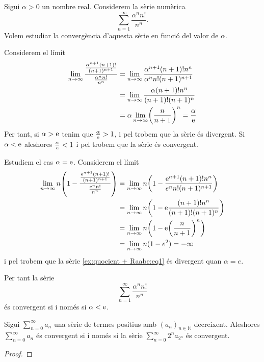 \documentclass[../Apunts.tex]{subfiles}
\begin{document}
	\begin{example}
		\label{ex:quocient + Raabe}
		Sigui \(\alpha>0\) un nombre real. Considerem la sèrie numèrica
		\begin{equation}
			\label{ex:quocient + Raabe:eq1}
			\sum_{n=1}^{\infty}\frac{\alpha^{n}n!}{n^{n}}.
		\end{equation}
		Volem estudiar la convergència d'aquesta sèrie en funció del valor de \(\alpha\).
		\begin{solution}
			Considerem el límit
			\begin{align*}
				\lim_{n\to\infty}\frac{\frac{\alpha^{n+1}(n+1)!}{(n+1)^{n+1}}}{\frac{\alpha^{n}n!}{n^{n}}}&=\lim_{n\to\infty}\frac{\alpha^{n+1}(n+1)!n^{n}}{\alpha^{n}n!(n+1)^{n+1}} \\
				&=\lim_{n\to\infty}\frac{\alpha(n+1)!n^{n}}{(n+1)!(n+1)^{n}} \\
				&=\alpha\lim_{n\to\infty}\left(\frac{n}{n+1}\right)^{n}=\frac{\alpha}{\e} %
			\end{align*}
			Per tant, si \(\alpha>\textrm{e}\) tenim que \(\frac{\alpha}{\textrm{e}}>1\), i pel  trobem que la sèrie és divergent. Si \(\alpha<\textrm{e}\) aleshores \(\frac{\alpha}{\textrm{e}}<1\) i pel  trobem que la sèrie és convergent.
			
			Estudiem el cas \(\alpha=\textrm{e}\). Considerem el límit
			\begin{align*}
				\lim_{n\to\infty}n\left(1-\frac{\frac{\e^{n+1}(n+1)!}{(n+1)^{n+1}}}{\frac{\e^{n}n!}{n^{n}}}\right)&=\lim_{n\to\infty}n\left(1-\frac{\e^{n+1}(n+1)!n^{n}}{e^{n}n!(n+1)^{n+1}}\right) \\
				&=\lim_{n\to\infty}n\left(1-\e\frac{(n+1)!n^{n}}{(n+1)!(n+1)^{n}}\right) \\
				&=\lim_{n\to\infty}n\left(1-\e\left(\frac{n}{n+1}\right)^{n}\right) \\
				&=\lim_{n\to\infty}n(1-e^{2})=-\infty %
			\end{align*}
			i pel  trobem que la sèrie \eqref{ex:quocient + Raabe:eq1} és divergent quan \(\alpha=e\).
			
			Per tant la sèrie
			\[\sum_{n=1}^{\infty}\frac{\alpha^{n}n!}{n^{n}}\]
			és convergent si i només si \(\alpha<\textrm{e}\).
		\end{solution}
	\end{example}
	\begin{proposition}
		\label{prop:criteri de condensació}
		Sigui \(\sum_{n=0}^{\infty}a_{n}\) una sèrie de termes positius amb \((a_{n})_{n\in\mathbb{N}}\) decreixent. Aleshores \(\sum_{n=0}^{\infty}a_{n}\) és convergent si i només si la sèrie \(\sum_{n=0}^{\infty}2^{n}a_{2^{n}}\) és convergent.
		\begin{proof}
		\end{proof}
	\end{proposition}
\end{document}
